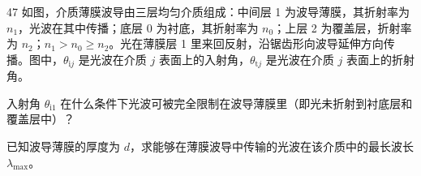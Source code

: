 \begin{problem}[第32届全国中学生物理竞赛复赛][介质薄膜波导]{47}
    如图，介质薄膜波导由三层均匀介质组成：中间层 1 为波导薄膜，其折射率为 $n_{1}$，光波在其中传播；底层 0 为衬底，其折射率为 $n_{0}$；上层 2 为覆盖层，折射率为 $n_{2}$；$n_{1} > n_{0} \geq n_{2}$。光在薄膜层 1 里来回反射，沿锯齿形向波导延伸方向传播。图中，$\theta_{\mathrm{i}j}$ 是光波在介质 $j$ 表面上的入射角，$\theta_{\mathrm{t}j}$ 是光波在介质 $j$ 表面上的折射角。
    \begin{subproblem}
        入射角 $\theta_{\mathrm{i}1}$ 在什么条件下光波可被完全限制在波导薄膜里（即光未折射到衬底层和覆盖层中）？
    \end{subproblem}
    \begin{subproblem}
        已知波导薄膜的厚度为 $d$，求能够在薄膜波导中传输的光波在该介质中的最长波长 $\lambda_{\max}$。
    \end{subproblem}
\end{problem}